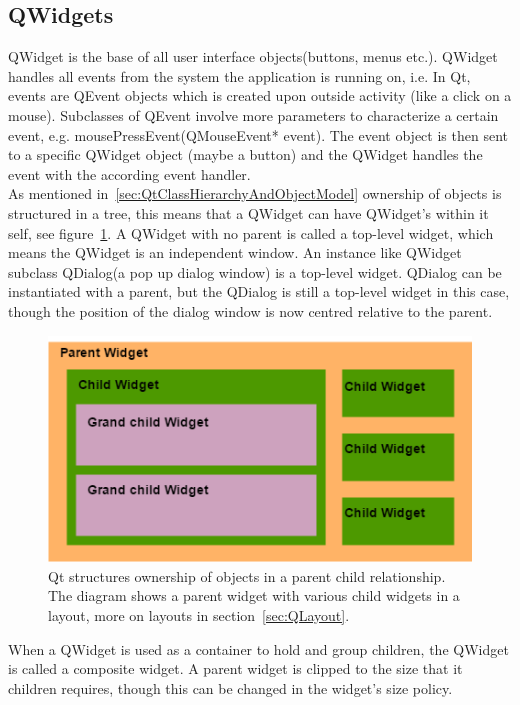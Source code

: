 \subsection{QWidgets}
\label{sec:qwidgets}
QWidget is the base of all user interface objects(buttons, menus etc.). QWidget handles all events from the system the application is running on, i.e. In Qt, events are QEvent objects which is created upon outside activity (like a click on a mouse). Subclasses of QEvent involve more parameters to characterize a certain event, e.g. mousePressEvent(QMouseEvent* event). The event object is then sent to a specific QWidget object (maybe a button) and the QWidget handles the event with the according event handler.\\
As mentioned in~\ref{sec:QtClassHierarchyAndObjectModel} ownership of objects is structured in a tree, this means that a QWidget can have QWidget's within it self, see figure~\ref{fig:QWidgetExample}. A QWidget with no parent is called a top-level widget, which means the QWidget is an independent window. An instance like QWidget subclass QDialog(a pop up dialog window) is a top-level widget. QDialog can be instantiated with a parent, but the QDialog is still a top-level widget in this case, though the position of the dialog window is now centred relative to the parent.

\begin{figure}[h]
	\centering
	\includegraphics[scale=0.55]{Figures/QWidgetExample.png}
	\caption{Qt structures ownership of objects in a parent child relationship. The diagram shows a parent widget with various child widgets in a layout, more on layouts in section~\ref{sec:QLayout}.}
	\label{fig:QWidgetExample}
\end{figure}

When a QWidget is used as a container to hold and group children, the QWidget is called a composite widget. A parent widget is clipped to the size that it children requires, though this can be changed in the widget's size policy. 


